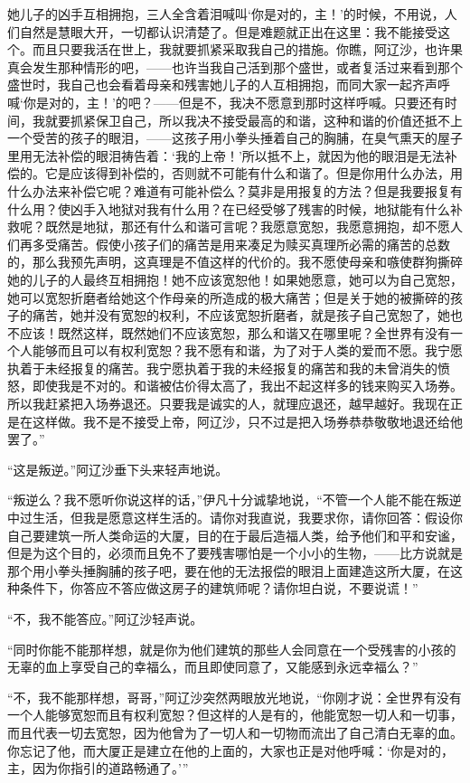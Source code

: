 她儿子的凶手互相拥抱，三人全含着泪喊叫‘你是对的，主！’的时候，不用说，人们自然是慧眼大开，一切都认识清楚了。但是难题就正出在这里：我不能接受这个。而且只要我活在世上，我就要抓紧采取我自己的措施。你瞧，阿辽沙，也许果真会发生那种情形的吧，——也许当我自己活到那个盛世，或者复活过来看到那个盛世时，我自己也会看着母亲和残害她儿子的人互相拥抱，而同大家一起齐声呼喊‘你是对的，主！’的吧？——但是不，我决不愿意到那时这样呼喊。只要还有时间，我就要抓紧保卫自己，所以我决不接受最高的和谐，这种和谐的价值还抵不上一个受苦的孩子的眼泪，——这孩子用小拳头捶着自己的胸脯，在臭气熏天的屋子里用无法补偿的眼泪祷告着：‘我的上帝！’所以抵不上，就因为他的眼泪是无法补偿的。它是应该得到补偿的，否则就不可能有什么和谐了。但是你用什么办法，用什么办法来补偿它呢？难道有可能补偿么？莫非是用报复的方法？但是我要报复有什么用？使凶手入地狱对我有什么用？在已经受够了残害的时候，地狱能有什么补救呢？既然是地狱，那还有什么和谐可言呢？我愿意宽恕，我愿意拥抱，却不愿人们再多受痛苦。假使小孩子们的痛苦是用来凑足为赎买真理所必需的痛苦的总数的，那么我预先声明，这真理是不值这样的代价的。我不愿使母亲和嗾使群狗撕碎她的儿子的人最终互相拥抱！她不应该宽恕他！如果她愿意，她可以为自己宽恕，她可以宽恕折磨者给她这个作母亲的所造成的极大痛苦；但是关于她的被撕碎的孩子的痛苦，她并没有宽恕的权利，不应该宽恕折磨者，就是孩子自己宽恕了，她也不应该！既然这样，既然她们不应该宽恕，那么和谐又在哪里呢？全世界有没有一个人能够而且可以有权利宽恕？我不愿有和谐，为了对于人类的爱而不愿。我宁愿执着于未经报复的痛苦。我宁愿执着于我的未经报复的痛苦和我的未曾消失的愤怒，即使我是不对的。和谐被估价得太高了，我出不起这样多的钱来购买入场券。所以我赶紧把入场券退还。只要我是诚实的人，就理应退还，越早越好。我现在正是在这样做。我不是不接受上帝，阿辽沙，只不过是把入场券恭恭敬敬地退还给他罢了。”
\par “这是叛逆。”阿辽沙垂下头来轻声地说。
\par “叛逆么？我不愿听你说这样的话，”伊凡十分诚挚地说，“不管一个人能不能在叛逆中过生活，但我是愿意这样生活的。请你对我直说，我要求你，请你回答：假设你自己要建筑一所人类命运的大厦，目的在于最后造福人类，给予他们和平和安谧，但是为这个目的，必须而且免不了要残害哪怕是一个小小的生物，——比方说就是那个用小拳头捶胸脯的孩子吧，要在他的无法报偿的眼泪上面建造这所大厦，在这种条件下，你答应不答应做这房子的建筑师呢？请你坦白说，不要说谎！”
\par “不，我不能答应。”阿辽沙轻声说。
\par “同时你能不能那样想，就是你为他们建筑的那些人会同意在一个受残害的小孩的无辜的血上享受自己的幸福么，而且即使同意了，又能感到永远幸福么？”
\par “不，我不能那样想，哥哥，”阿辽沙突然两眼放光地说，“你刚才说：全世界有没有一个人能够宽恕而且有权利宽恕？但这样的人是有的，他能宽恕一切人和一切事，而且代表一切去宽恕，因为他曾为了一切人和一切物而流出了自己清白无辜的血。你忘记了他，而大厦正是建立在他的上面的，大家也正是对他呼喊：‘你是对的，主，因为你指引的道路畅通了。’”
